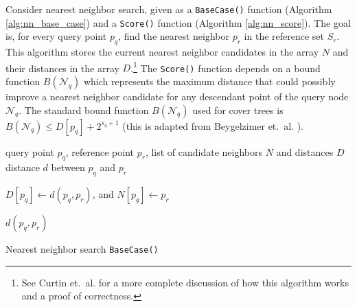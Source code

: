 Consider nearest neighbor search, given as a \texttt{BaseCase()} function
(Algorithm \ref{alg:nn_base_case}) and a \texttt{Score()} function (Algorithm
\ref{alg:nn_score}).  The goal is, for every query point $p_q$, find the nearest
neighbor $p_r$ in the reference set $S_r$.  This algorithm stores the current
nearest neighbor candidates in the array $N$ and their distances in the array
$D$.\footnote{See Curtin et.~al. \cite{curtin2013tree} for a more complete
discussion of how this algorithm works and a proof of correctness.}  The
\texttt{Score()} function depends on a bound function $B(\mathscr{N}_q)$ which
represents the maximum distance that could possibly improve a nearest neighbor
candidate for any descendant point of the query node $\mathscr{N}_q$.  The
standard bound function $B(\mathscr{N}_q)$ used for cover trees is
$B(\mathscr{N}_q) \le D[p_q] + 2^{s_q + 1}$ (this is adapted from
Beygelzimer et.~al. \cite{langford2006}).


\begin{algorithm}[tb]
\begin{algorithmic}
     query point $p_q$, reference point $p_r$, list of
candidate neighbors $N$ and distances $D$
     distance $d$ between $p_q$ and $p_r$

    \medskip

    \STATE  $D[p_q] \gets d(p_q, p_r)$, and $N[p_q] \gets p_r$
    \ENDIF

    \RETURN $d(p_q, p_r)$
  \end{algorithmic}

  \caption{Nearest neighbor search \texttt{BaseCase()}}
  \label{alg:nn_base_case}
\end{algorithm}


